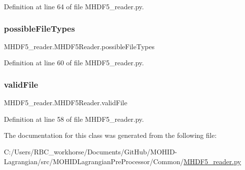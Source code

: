 Definition at line 64 of file M\+H\+D\+F5\+\_\+reader.\+py.

\mbox{\label{class_m_h_d_f5__reader_1_1_m_h_d_f5_reader_a0e8a8ab15e9fff5f77171f3245b62519}} 
\subsubsection{\texorpdfstring{possible\+File\+Types}{possibleFileTypes}}
{\footnotesize\ttfamily M\+H\+D\+F5\+\_\+reader.\+M\+H\+D\+F5\+Reader.\+possible\+File\+Types}



Definition at line 60 of file M\+H\+D\+F5\+\_\+reader.\+py.

\mbox{\label{class_m_h_d_f5__reader_1_1_m_h_d_f5_reader_a3851a933c4dd5d4d33f38dfe120e134e}} 
\subsubsection{\texorpdfstring{valid\+File}{validFile}}
{\footnotesize\ttfamily M\+H\+D\+F5\+\_\+reader.\+M\+H\+D\+F5\+Reader.\+valid\+File}



Definition at line 58 of file M\+H\+D\+F5\+\_\+reader.\+py.



The documentation for this class was generated from the following file\+:\begin{DoxyCompactItemize}
\item 
C\+:/\+Users/\+R\+B\+C\+\_\+workhorse/\+Documents/\+Git\+Hub/\+M\+O\+H\+I\+D-\/\+Lagrangian/src/\+M\+O\+H\+I\+D\+Lagrangian\+Pre\+Processor/\+Common/\mbox{\hyperlink{_m_h_d_f5__reader_8py}{M\+H\+D\+F5\+\_\+reader.\+py}}\end{DoxyCompactItemize}
